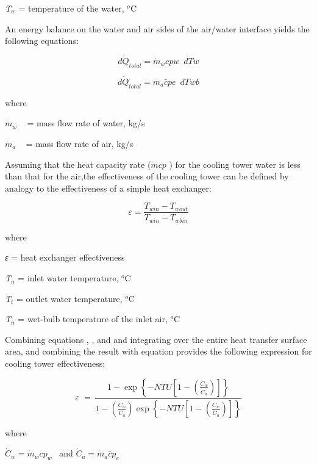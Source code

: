 \emph{T\(_{w}\)} = temperature of the water, \(^{o}\)C

An energy balance on the water and air sides of the air/water interface yields the following equations:

\begin{equation}
d{\dot Q_{total}} = {\dot m_w}cpw\,\,\,dTw
\end{equation}

\begin{equation}
d{\dot Q_{total}} = {\dot m_a}\bar cpe\,\,\,dTwb
\end{equation}

where

\({\dot m_w}\) ~ = mass flow rate of water, kg/s

\({\dot m_a}\) ~ = mass flow rate of air, kg/s

Assuming that the heat capacity rate (\(\dot mcp\) ) for the cooling tower water is less than that for the air,the effectiveness of the cooling tower can be defined by analogy to the effectiveness of a simple heat exchanger:

\begin{equation}
\varepsilon  = \frac{{{T_{win}} - {T_{wout}}}}{{{T_{win}} - {T_{wbin}}}}
\end{equation}

where

\emph{ε} = heat exchanger effectiveness

\emph{T\(_{n}\)} = inlet water temperature, \(^{o}\)C

\emph{T\(_{t}\)} = outlet water temperature, \(^{o}\)C

\emph{T\(_{n}\)} = wet-bulb temperature of the inlet air, \(^{o}\)C

Combining equations , , and and integrating over the entire heat transfer surface area, and combining the result with equation provides the following expression for cooling tower effectiveness:

\begin{equation}
\varepsilon \,\, = \,\frac{{1 - \exp \left\{ { - NTU\left[ {1 - \left( {\frac{{{{\dot C}_w}}}{{{{\dot C}_a}}}} \right)} \right]} \right\}}}{{1 - \left( {\frac{{{{\dot C}_w}}}{{{{\dot C}_a}}}} \right)\exp \left\{ { - NTU\left[ {1 - \left( {\frac{{{{\dot C}_w}}}{{{{\dot C}_a}}}} \right)} \right]} \right\}}}
\end{equation}

where

\({\dot C_w} = {\dot m_w}c{p_w}\) ~and \({\dot C_a} = {\dot m_a}\bar c{p_e}\)

